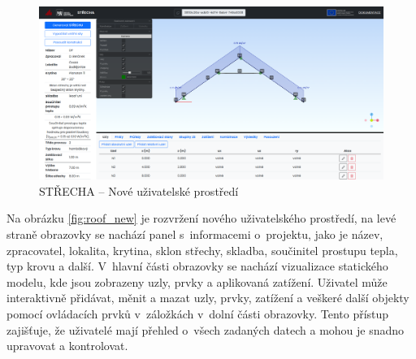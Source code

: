 \begin{figure}[H]
    \includegraphics{assets/figures/wbapp/strecha_new.png}
    \caption{STŘECHA -- Nové uživatelské prostředí}
    \label{fig:roof_new}
\end{figure}

Na obrázku \autoref{fig:roof_new} je rozvržení nového uživatelského prostředí, na levé straně obrazovky se nachází panel s~informacemi o~projektu, jako je název, zpracovatel, lokalita, krytina, sklon střechy, skladba, součinitel prostupu tepla, typ krovu a další. V~hlavní části obrazovky se nachází vizualizace statického modelu, kde jsou zobrazeny uzly, prvky a aplikovaná zatížení. Uživatel může interaktivně přidávat, měnit a mazat uzly, prvky, zatížení a veškeré další objekty pomocí ovládacích prvků v~záložkách v~dolní části obrazovky. Tento přístup zajišťuje, že uživatelé mají přehled o~všech zadaných datech a mohou je snadno upravovat a kontrolovat.

